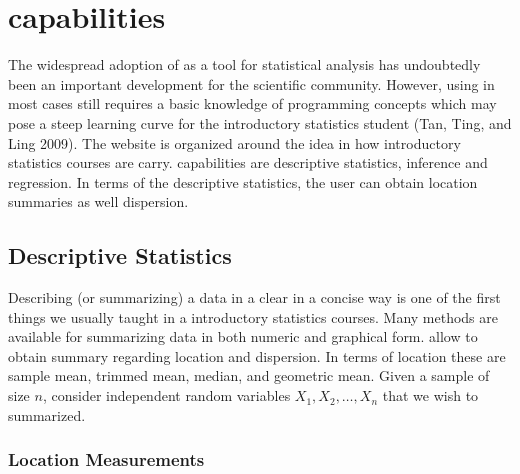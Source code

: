 \section*{\FIRSTkit capabilities}

The widespread adoption of \R as a tool for statistical analysis has undoubtedly been an important development for the scientific community. However, using \R in most cases still requires a basic knowledge of programming concepts which may pose a steep learning curve for the introductory statistics student (Tan, Ting, and Ling 2009). The website is organized around the idea in how introductory statistics courses are carry. \FIRSTkit capabilities are descriptive statistics, inference and regression. In terms of the descriptive statistics, the user can obtain location summaries as well dispersion. 

\subsection{Descriptive Statistics}

Describing (or summarizing) a data in a clear in a concise way is one of the first things we usually taught in a introductory statistics courses. Many methods are available for summarizing data in both numeric and graphical form. \FIRSTkit allow to obtain summary regarding location and dispersion. In terms of location these are sample mean, trimmed mean, median, and geometric mean. Given a sample of size $n$, consider independent random variables $X_1, X_2,\ldots, X_n$ that we wish to summarized. 

\subsubsection{Location Measurements}

